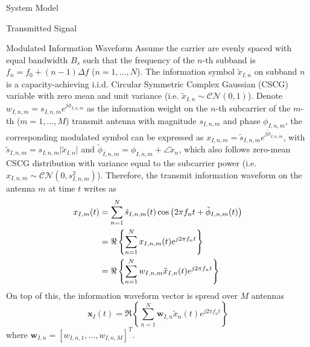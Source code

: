 \documentclass{IEEEtran}
\begin{document}
\begin{section} {System Model}
\begin{subsection} {Transmitted Signal}
		\begin{subsubsection} {Modulated Information Waveform}
			Assume the carrier are evenly spaced with equal bandwidth $B_s$ such that the frequency of the $n$-th subband is $f_n = f_0+(n-1) \Delta f$ ($n = 1,\dots,N$). The information symbol $\tilde{x}_{I,n}$ on subband $n$ is a capacity-achieving i.i.d. Circular Symmetric Complex Gaussian (CSCG) variable with zero mean and unit variance (i.e. $\tilde{x}_{I,n} \sim \mathcal{CN}(0,1)$). Denote $w_{I,n,m} = s_{I,n,m} e^{j\phi_{I,n,m}}$ as the information weight on the $n$-th subcarrier of the $m$-th ($m = 1,\dots,M$) transmit antenna with magnitude $s_{I,n,m}$ and phase $\phi_{I,n,m}$, the corresponding modulated symbol can be expressed as $x_{I,n,m} = \tilde{s}_{I,n,m} e^{j\tilde{\phi}_{I,n,m}}$, with $\tilde{s}_{I,n,m} = s_{I,n,m} \lvert\tilde{x}_{I,n}\rvert$ and $\tilde{\phi}_{I,n,m} = \phi_{I,n,m} + \angle{\tilde{x}_n}$, which also follows zero-mean CSCG distribution with variance equal to the subcarrier power (i.e. $x_{I,n,m} \sim \mathcal{CN}(0,s_{I,n,m}^2)$). Therefore, the transmit information waveform on the antenna $m$ at time $t$ writes as
			\begin{equation} \label{eq:x_{I,m}(t)}
				\begin{split}
					x_{I,m}(t)
					&= \sum_{n=1}^{N} \tilde{s}_{I,n,m}(t) \cos \left( 2 \pi f_n t + \tilde{\phi}_{I,n,m}(t) \right) \\
					&= \Re \left\{ \sum_{n=1}^{N} x_{I,n,m}(t) e^{j2 \pi f_n t} \right\} \\
					&= \Re \left\{ \sum_{n=1}^{N} w_{I,n,m} \tilde{x}_{I,n}(t) e^{j2 \pi f_n t} \right\}
				\end{split}
			\end{equation}
			On top of this, the information waveform vector is spread over $M$ antennas
			\begin{equation} \label{eq:x_I(t)}
				\boldsymbol{x}_I(t) = \Re \left\{ \sum_{n=1}^{N} \boldsymbol{w}_{I,n}\tilde{x}_n(t) e^{j2{\pi}{f_n}t} \right\}
			\end{equation}
			where $\boldsymbol{w}_{I,n}=[w_{I,n,1},\dots,w_{I,n,M}]^T$.
		\end{subsubsection}


\end{subsection}
\end{section}
\end{document}
